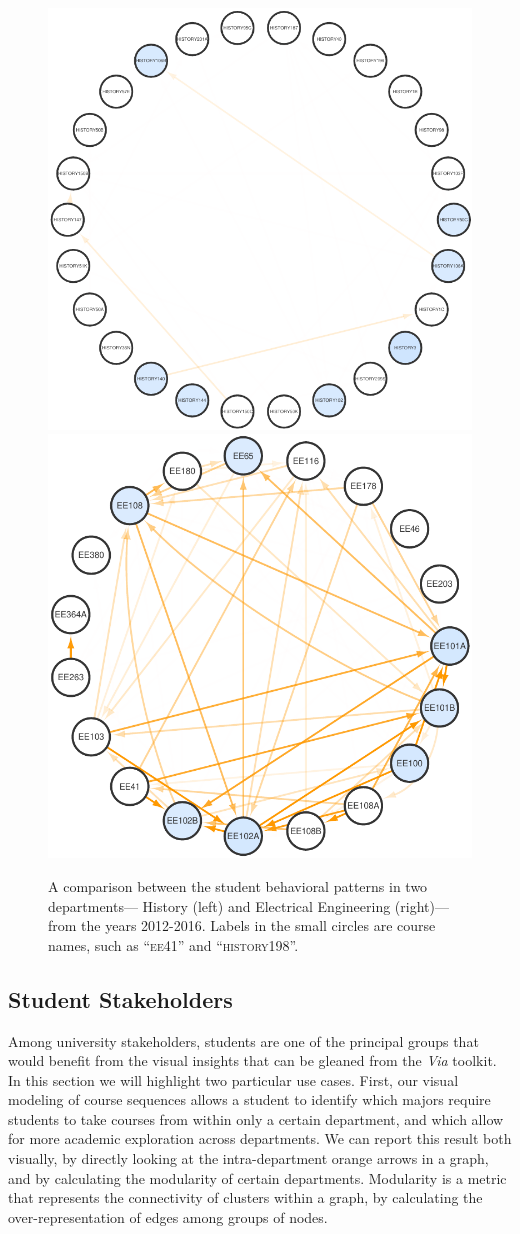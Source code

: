 \documentclass{sigchi}
\begin{document}
\begin{figure}
    \centering
    \includegraphics[width=0.55\columnwidth]{Figs/final-modularity-history.pdf}
    \includegraphics[width=0.44\columnwidth]{Figs/final-modularity-ee.pdf}
    \caption{A comparison between the student behavioral patterns in two departments--- History (left) and Electrical Engineering (right)---from the years 2012-2016. Labels in the small circles are course names, such as ``\textsc{ee41}'' and ``\textsc{history198}''.}
    \label{fig:modularity}
\end{figure}

\subsection{Student Stakeholders}
\label{sec:student_stakeholders}
Among university stakeholders, students are one of the principal
groups that would benefit from the visual insights that can be gleaned
from the \textit{Via} toolkit. In this section we will highlight two
particular use cases. First, our visual modeling of course sequences allows a student to identify which majors require students to take courses from within only a certain department, and which allow for more academic exploration across departments. We can report this result both visually, by directly looking at the intra-department orange arrows in a graph, and by calculating the modularity of certain departments. Modularity is a metric that represents the connectivity of clusters within a graph, by calculating the over-representation of edges among groups of nodes.
\end{document}
